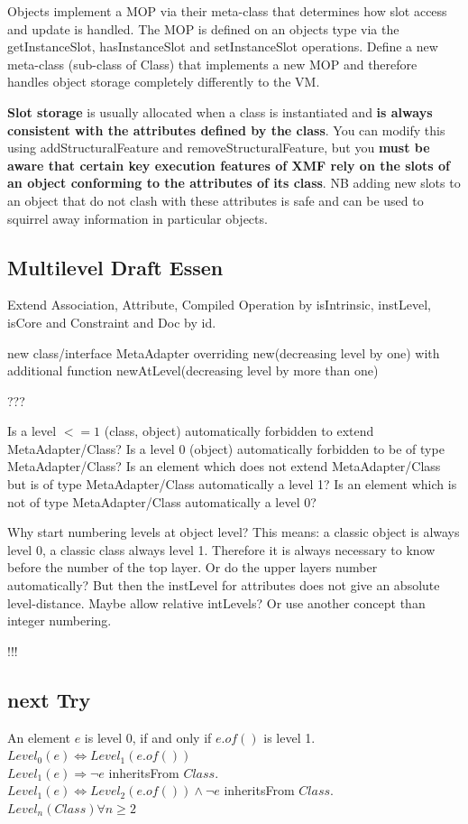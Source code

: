 \documentclass{scrreprt}
\newcounter{myCounter}[subsubsection]
\newcommand{\layerThree}[1]{\subsection{#1} \setcounter{myCounter}{0}}
\begin{document}
Objects implement a MOP via their meta-class that determines how slot access and update is handled. The MOP is defined on an objects type via the getInstanceSlot, hasInstanceSlot and setInstanceSlot operations. Define a new meta-class (sub-class of Class) that implements a new MOP and therefore handles object storage completely differently to the VM. 
\vspace{3mm}

\textbf{Slot storage} is usually allocated when a class is instantiated and \textbf{is always consistent with the attributes defined by the class}. You can modify this using addStructuralFeature and removeStructuralFeature, but you \textbf{must be aware that certain key execution features of XMF rely on the slots of an object conforming to the attributes of its class}. NB adding new slots to an object that do not clash with these attributes is safe and can be used to squirrel away information in particular objects.

\layerThree{Multilevel Draft Essen} 

Extend Association, Attribute, Compiled Operation by isIntrinsic, instLevel, isCore and Constraint and Doc by id.

new class/interface MetaAdapter overriding new(decreasing level by one) with additional function newAtLevel(decreasing level by more than one) 

???

Is a level $<=1$ (class, object) automatically forbidden to extend MetaAdapter/Class?
Is a level 0 (object) automatically forbidden to be of type MetaAdapter/Class?
Is an element which does not extend MetaAdapter/Class but is of type MetaAdapter/Class automatically a level 1?
Is an element which is not of type MetaAdapter/Class automatically a level 0?

Why start numbering levels at object level?
This means: a classic object is always level 0, a classic class always level 1.
Therefore it is always necessary to know before the number of the top layer.
Or do the upper layers number automatically? But then the instLevel for attributes does not give an absolute level-distance. Maybe allow relative intLevels? Or use another concept than integer numbering.

!!!

\layerThree{next Try} 

An element $e$ is level $0$, if and only if $e.of()$ is level 1.\\
$Level_0(e)\Leftrightarrow Level_1(e.of())$\\
$Level_1(e)\Rightarrow \neg e $ inheritsFrom $ Class$.\\
$Level_1(e)\Leftrightarrow Level_2(e.of()) \wedge \neg e $ inheritsFrom $ Class$.\\
$Level_n(Class) \forall n \geq 2$
\end{document}
